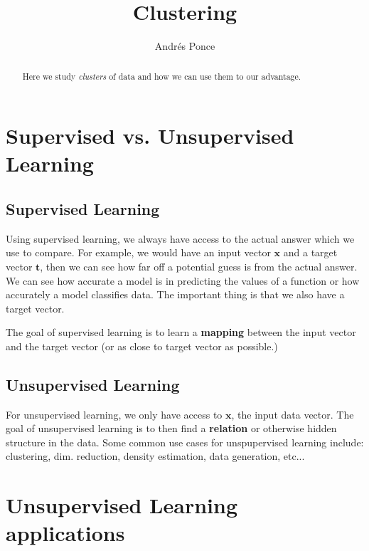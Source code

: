 \documentclass{tufte-handout}
\title{Clustering}
\author{Andr\'es Ponce}
\begin{document}
\maketitle

\begin{abstract}
	Here we study \textit{clusters} of data and how we can use them
	to our advantage.
\end{abstract}

\section{Supervised vs. Unsupervised Learning}
	\subsection{Supervised Learning}
		Using supervised learning, we always have access to the actual 
		answer which we use to compare. For example, we would have an 
		input vector $\mathbf{x}$ and a target vector $\mathbf{t}$,
		then we can see how far off a potential guess is from the actual
		answer. We can see how accurate a model is in predicting the values
		of a function or how accurately a model classifies data. The important
		thing is that we also have a target vector.

		The goal of supervised learning is to learn a \textbf{mapping} between
		the input vector and the target vector (or as close to target vector as 
		possible.)
		
	\subsection{Unsupervised Learning}
		For unsupervised learning, we only have access to $\mathbf{x}$, the 
		input data vector. 
		The goal of unsupervised learning is to then find a \textbf{relation} or
		otherwise hidden structure in the data. Some common use cases for
		unspupervised learning include: clustering, dim. reduction, density estimation,
		data generation, etc...

\section{Unsupervised Learning applications}
\end{document}
